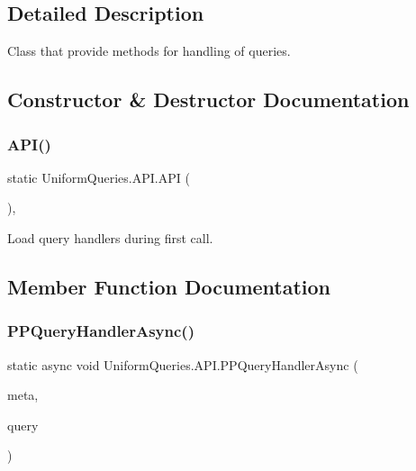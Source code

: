 \subsection{Detailed Description}
Class that provide methods for handling of queries. 



\subsection{Constructor \& Destructor Documentation}
\mbox{\label{class_uniform_queries_1_1_a_p_i_a8dbe3d00dcf507ab3cea1dc58e1e154f}} 
\subsubsection{\texorpdfstring{A\+P\+I()}{API()}}
{\footnotesize\ttfamily static Uniform\+Queries.\+A\+P\+I.\+A\+PI (\begin{DoxyParamCaption}{ }\end{DoxyParamCaption})\hspace{0.3cm}{\ttfamily [static]}, {\ttfamily [private]}}



Load query handlers during first call. 



\subsection{Member Function Documentation}
\mbox{\label{class_uniform_queries_1_1_a_p_i_a2f6a1dee18c3b462a8a794d68e326dba}} 
\subsubsection{\texorpdfstring{P\+P\+Query\+Handler\+Async()}{PPQueryHandlerAsync()}}
{\footnotesize\ttfamily static async void Uniform\+Queries.\+A\+P\+I.\+P\+P\+Query\+Handler\+Async (\begin{DoxyParamCaption}\item[{\mbox{\hyperlink{class_pipes_provider_1_1_server_transmission_meta}{Pipes\+Provider.\+Server\+Transmission\+Meta}}}]{meta,  }\item[{string}]{query }\end{DoxyParamCaption})\hspace{0.3cm}{\ttfamily [static]}}



